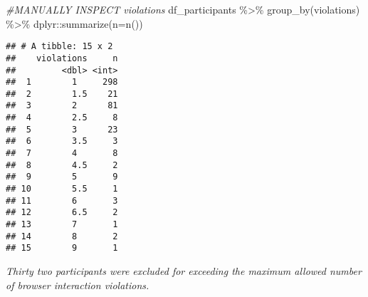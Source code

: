 \documentclass[
]{article}
\newenvironment{Shaded}{\begin{snugshade}}{\end{snugshade}}
\newcommand{\AttributeTok}[1]{\textcolor[rgb]{0.77,0.63,0.00}{#1}}
\newcommand{\CommentTok}[1]{\textcolor[rgb]{0.56,0.35,0.01}{\textit{#1}}}
\newcommand{\FunctionTok}[1]{\textcolor[rgb]{0.00,0.00,0.00}{#1}}
\newcommand{\NormalTok}[1]{#1}
\newcommand{\OtherTok}[1]{\textcolor[rgb]{0.56,0.35,0.01}{#1}}
\newcommand{\SpecialCharTok}[1]{\textcolor[rgb]{0.00,0.00,0.00}{#1}}
\newcommand{\StringTok}[1]{\textcolor[rgb]{0.31,0.60,0.02}{#1}}
\begin{document}
\begin{Shaded}
\begin{Highlighting}[]
\CommentTok{\#MANUALLY INSPECT violations}
\NormalTok{df\_participants }\SpecialCharTok{\%\textgreater{}\%} \FunctionTok{group\_by}\NormalTok{(violations) }\SpecialCharTok{\%\textgreater{}\%} 
\NormalTok{  dplyr}\SpecialCharTok{::}\FunctionTok{summarize}\NormalTok{(}\AttributeTok{n=}\FunctionTok{n}\NormalTok{())}
\end{Highlighting}
\end{Shaded}

\begin{verbatim}
## # A tibble: 15 x 2
##    violations     n
##         <dbl> <int>
##  1        1     298
##  2        1.5    21
##  3        2      81
##  4        2.5     8
##  5        3      23
##  6        3.5     3
##  7        4       8
##  8        4.5     2
##  9        5       9
## 10        5.5     1
## 11        6       3
## 12        6.5     2
## 13        7       1
## 14        8       2
## 15        9       1
\end{verbatim}

\begin{Shaded}
\end{Shaded}

\emph{Thirty two participants were excluded for exceeding the maximum
allowed number of browser interaction violations.}
\end{document}

